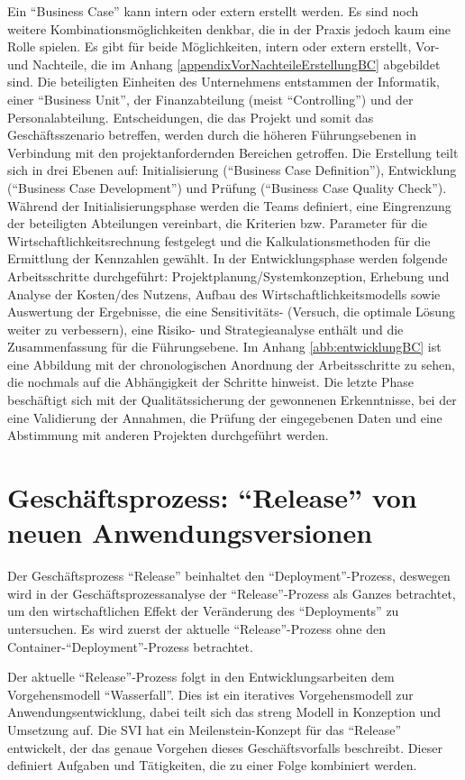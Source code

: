Ein \enquote{Business Case} kann intern oder extern erstellt werden. Es sind noch weitere Kombinationsmöglichkeiten denkbar, die in der Praxis jedoch kaum eine Rolle spielen.\autocite[vgl.][S.\,33]{brugger_it_2009} Es gibt für beide Möglichkeiten, intern oder extern erstellt, Vor- und Nachteile, die im Anhang \vref{appendixVorNachteileErstellungBC} abgebildet sind. Die beteiligten Einheiten des Unternehmens entstammen der Informatik, einer \enquote{Business Unit}, der Finanzabteilung (meist \enquote{Controlling}) und der Personalabteilung. Entscheidungen, die das Projekt und somit das Geschäftsszenario betreffen, werden durch die höheren Führungsebenen in Verbindung mit den projektanfordernden Bereichen getroffen. Die Erstellung teilt sich in drei Ebenen auf: Initialisierung (\enquote{Business Case Definition}), Entwicklung (\enquote{Business Case Development}) und Prüfung (\enquote{Business Case Quality Check}).\autocite[vgl.][S.\,41-42]{brugger_it_2009} Während der Initialisierungsphase werden die Teams definiert, eine Eingrenzung der beteiligten Abteilungen vereinbart, die Kriterien bzw. Parameter für die Wirtschaftlichkeitsrechnung festgelegt und die Kalkulationsmethoden für die Ermittlung der Kennzahlen gewählt. In der Entwicklungsphase werden folgende Arbeitsschritte durchgeführt: Projektplanung/Systemkonzeption, Erhebung und Analyse der Kosten/des Nutzens, Aufbau des Wirtschaftlichkeitsmodells sowie Auswertung der Ergebnisse, die eine Sensitivitäts- (Versuch, die optimale Lösung weiter zu verbessern), eine Risiko- und Strategieanalyse enthält und die Zusammenfassung für die Führungsebene. Im Anhang \vref{abb:entwicklungBC} ist eine Abbildung mit der chronologischen Anordnung der Arbeitsschritte zu sehen, die nochmals auf die Abhängigkeit der Schritte hinweist. Die letzte Phase beschäftigt sich mit der Qualitätssicherung der gewonnenen Erkenntnisse, bei der eine Validierung der Annahmen, die Prüfung der eingegebenen Daten und eine Abstimmung mit anderen Projekten durchgeführt werden. 

\section{Geschäftsprozess: \enquote{Release} von neuen Anwendungsversionen}
Der Geschäftsprozess \enquote{Release} beinhaltet den \enquote{Deployment}-Prozess, deswegen wird in der Geschäftsprozessanalyse der \enquote{Release}-Prozess als Ganzes betrachtet, um den wirtschaftlichen Effekt der Veränderung des \enquote{Deployments} zu untersuchen. Es wird zuerst der aktuelle \enquote{Release}-Prozess  ohne den Container-\enquote{Deployment}-Prozess betrachtet.
\par
Der aktuelle \enquote{Release}-Prozess folgt in den Entwicklungsarbeiten dem Vorgehensmodell \enquote{Wasserfall}. Dies ist ein iteratives Vorgehensmodell zur Anwendungsentwicklung, dabei teilt sich das streng Modell in Konzeption und Umsetzung auf.\autocite[vgl.][S.\,24]{freund_praxishandbuch_2017} Die \ac{SVI} hat ein Meilenstein-Konzept für das \enquote{Release} entwickelt, der das genaue Vorgehen dieses Geschäftsvorfalls beschreibt. Dieser definiert Aufgaben und Tätigkeiten, die zu einer Folge kombiniert werden. 

